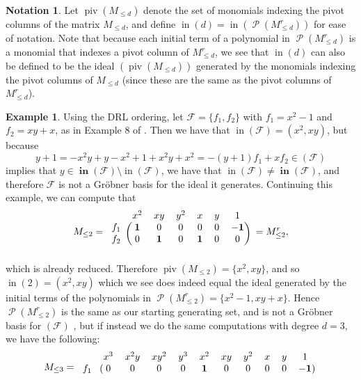 \documentclass[11pt]{article}
\newcommand{\F}{\mathcal{F}}
\DeclareMathOperator{\Poly}{\mathscr{P}}
\DeclareMathOperator{\init}{in}
\DeclareMathOperator{\Init}{\mathbf{in}}
\DeclareMathOperator{\piv}{piv}
\theoremstyle{definition}
\newtheorem{example}{Example}
\newtheorem*{notation}{Notation}
\begin{document}
\begin{notation}
	Let $\piv(M_{\leq d})$ denote the set of monomials indexing the pivot columns of the matrix $M_{\leq d}$, and define $\init(d) = \init(\Poly(M_{\leq d}^r))$ for ease of notation. Note that because each initial term of a polynomial in $\Poly(M_{\leq d}^r)$ is a monomial that indexes a pivot column of $M_{\leq d}^r$, we see that $\init(d)$ can also be defined to be the ideal $(\piv(M_{\leq d}))$ generated by the monomials indexing the pivot columns of $M_{\leq d}$ (since these are the same as the pivot columns of $M_{\leq d}^r$). 
\end{notation}


\begin{example}
	Using the DRL ordering, let $\F = \{f_1, f_2\}$ with $f_1 = x^2 - 1$ and $f_2 = xy + x$, as in Example 8 of \cite{caminata2020solving}. Then we have that $\init(\F) = (x^2, xy)$, but because \[ y + 1 = -x^2y + y - x^2 + 1 + x^2y + x^2 = -(y + 1) f_1 + x f_2 \in (\F) \] implies that $y \in \Init(\F) \setminus \init(\F)$, we have that $\init(\F) \neq \Init(\F)$, and therefore $\F$ is not a Gröbner basis for the ideal it generates. Continuing this example, we can compute that \[ M_{\leq 2} = \begin{blockarray}{ccccccc}
	    & x^2 & xy & y^2 & x & y & 1 \\
	    \begin{block}{c(cccccc)}
	        f_1 & \mathbf{1} & 0 & 0 & 0 & 0 & \mathbf{-1} \\
	        f_2 & 0 & \mathbf{1} & 0 & \mathbf{1} & 0 & 0 \\
	    \end{block}
	\end{blockarray} \,\, = M_{\leq 2}^r, \] which is already reduced. Therefore $\piv(M_{\leq 2}) = \{x^2, xy\}$, and so $\init(2) = (x^2, xy)$ which we see does indeed equal the ideal generated by the initial terms of the polynomials in $\Poly(M_{\leq 2}^r) = \{x^2 - 1, xy + x\}$. Hence $\Poly(M_{\leq 2}^r)$ is the same as our starting generating set, and is not a Gröbner basis for $(\F)$ , but if instead we do the same computations with degree $d = 3$, we have the following: \[ M_{\leq 3} = \begin{blockarray}{ccccccccccc}
	    & x^3 & x^2y & xy^2 & y^3 & x^2 & xy & y^2 & x & y & 1 \\
	    \begin{block}{c(cccccccccc)}
	        f_1 & 0 & 0 & 0 & 0 & \mathbf{1} & 0 & 0 & 0 & 0 & \mathbf{-1} \\

\end{block}
\end{blockarray}\]
\end{example}
\end{document}
